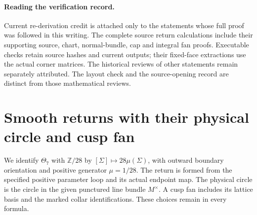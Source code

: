 \paragraph{Reading the verification record.}
Current re-derivation credit is attached only to the statements
whose full proof was followed in this writing. The complete source
return calculations include their supporting source, chart,
normal-bundle, cap and integral fan proofs. Executable checks retain
source hashes and current outputs; their fixed-face extractions use
the actual corner matrices. The historical reviews of other
statements remain separately attributed. The layout check and
the source-opening record are distinct from those mathematical
reviews.

\section{Smooth returns with their physical circle and cusp fan}
\label{sec:IV-results}

We identify $\Theta _7$ with $\mathbb Z/28$ by
$[\Sigma]\mapsto28\mu(\Sigma)$, with outward boundary orientation
and positive generator $\mu=1/28$.  The return is formed from the
specified positive parameter loop and its actual endpoint map.
The physical circle is the circle in the given punctured line bundle
$M^\times$.  A cusp fan includes its lattice basis and the marked
collar identifications.  These choices remain in every formula.

